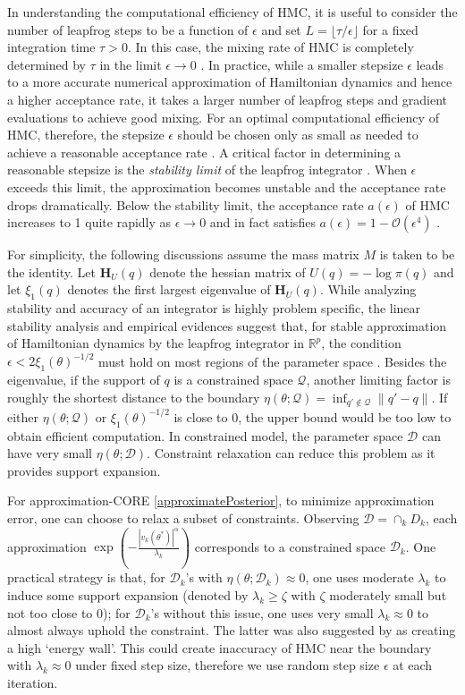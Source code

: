 \documentclass[10pt,fleqn]{article}
\newcommand{\bb}[1]{\mathbb{#1}}
\newcommand{\mc}[1]{\mathcal{#1}}
\DeclareMathOperator{\1}{\mathbbm{1}}
\newcommand{\dt}{\epsilon} %
\newcommand{\mass}{M} %
\newcommand{\hess}{\mathbf{H}} %
\begin{document}
In understanding the computational efficiency of HMC, it is useful to
consider the number of leapfrog steps to be a function of $\dt$ and
set $L = \lfloor \tau / \dt \rfloor$ for a fixed integration
time $\tau > 0$. In this case, the mixing rate of HMC is completely
determined by $\tau$ in the limit $\dt \to 0$ \citep{betancourt17}. In
practice, while a smaller stepsize $\dt$ leads to a more accurate
numerical approximation of Hamiltonian dynamics and hence a higher
acceptance rate, it takes a larger number of leapfrog steps and
gradient evaluations to achieve good mixing. For an optimal
computational efficiency of HMC, therefore, the stepsize $\dt$ should
be chosen only as small as needed to achieve a reasonable acceptance
rate \citep{beskos13, betancourt14}. A critical factor in determining
a reasonable stepsize is the \textit{stability limit} of the leapfrog
integrator \citep{neal2011mcmc}. When $\dt$ exceeds this limit, the
approximation becomes unstable and the acceptance rate drops
dramatically. Below the stability limit, the acceptance rate $a(\dt)$
of HMC increases to 1 quite rapidly as $\dt \to 0$ and in fact
satisfies $a(\dt) = 1 - \mc O(\dt^4)$ \citep{beskos13}.

For simplicity, the following discussions assume the mass matrix $\mass$ is taken to be the identity. Let $\hess_U(q)$ denote the hessian matrix of $U(q) = - \log \pi(q)$ and let $\xi_1(q)$ denotes the first largest eigenvalue of $\hess_U(q)$. While analyzing stability and accuracy of an integrator is highly problem specific, the linear stability analysis and empirical evidences suggest that, for stable approximation of Hamiltonian dynamics by the leapfrog integrator in $\bb R^p$, the condition $\dt < 2\xi_1(\theta)^{-1/2}$ must hold on most regions of the parameter space \citep{hairer06}.
Besides the eigenvalue, if the support of $q$ is a constrained space $\mc Q$, another limiting factor is roughly the shortest distance to the boundary $\eta (\theta; {\mc Q})= \inf_{q'\not\in \mc Q}\|q'-q\|$. If either $\eta (\theta; {\mc Q})$ or $\xi_1(\theta)^{-1/2}$ 
is close to $0$, the upper bound would be too low to obtain efficient computation.
In constrained model, the parameter space $\mc D$ can have very small $\eta(\theta;\mc D)$. Constraint relaxation can reduce this problem as it provides support
expansion. 

For approximation-CORE \eqref{approximatePosterior}, to minimize approximation
error, one can choose to relax a subset of constraints. Observing  $\mc D=\cap_{k} D_k$,
each approximation $\exp(-\frac{|v_k(\theta^*)|^\alpha}{\lambda_k})$ corresponds to a constrained space $\mc D_k$.  One practical strategy is that, for $\mc D_k$'s with $\eta(\theta;\mc D_k)\approx 0$, one uses moderate $\lambda_k$ to induce some support expansion (denoted by $\lambda_k\ge \zeta$ with $\zeta$ moderately small but not too close to $0$);  for $\mc D_k$'s without this issue, one uses very small $\lambda_k\approx 0$ to almost always uphold the constraint.
The latter was also suggested by \cite{neal2011mcmc} as creating a high `energy wall'. This could create  inaccuracy of HMC near the boundary with $\lambda_k\approx 0$ under fixed step size, therefore we use random step size $\epsilon$ at each iteration.
\end{document}

